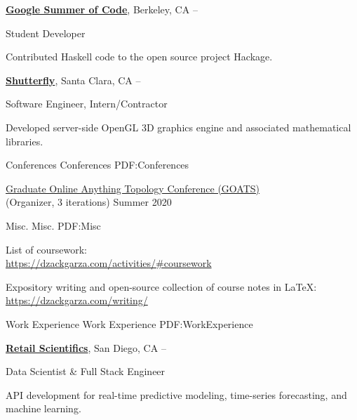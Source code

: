 \documentclass[letterpaper,MMMyyyy,nonstopmode]{simpleresumecv}
\begin{document}
\begin{Body}
\BigGap
\Entry
\href{https://summerofcode.withgoogle.com/archive/}
{\textbf{Google Summer of Code}},
Berkeley, CA
\hfill
{} --

\Gap
\BulletItem
Student Developer

\begin{Detail}
\SubBulletItem
Contributed Haskell code to the open source project Hackage.
\end{Detail}


\BigGap
\Entry
\href{http://www.shutterfly.com/}
{\textbf{Shutterfly}},
Santa Clara, CA
\hfill
{} --

\Gap
\BulletItem
Software Engineer, Intern/Contractor
\begin{Detail}
\SubBulletItem
Developed server-side OpenGL 3D graphics engine and associated mathematical libraries.
\end{Detail}



\Section
{Conferences}
{Conferences}
{PDF:Conferences}

\Gap
\BulletItem \href{https://dzackgarza.com/GOATS_2020/}{Graduate Online Anything Topology Conference (GOATS)} \\
(Organizer, 3 iterations)
\hfill Summer 2020


\Section
{Misc.}
{Misc.}
{PDF:Misc}

\BulletItem 
List of coursework: \\
\href{https://dzackgarza.com/activities/#coursework}{https://dzackgarza.com/activities/#coursework}

\BulletItem 
Expository writing and open-source collection of course notes in \LaTeX: \\
\href{https://dzackgarza.com/writing/}{https://dzackgarza.com/writing/}


\Section
{Work Experience}
{Work Experience}
{PDF:WorkExperience}

\Entry
\href{https://www.retailscientifics.com/}
{\textbf{Retail Scientifics}},
San Diego, CA
\hfill
{} --

\Gap
\BulletItem
Data Scientist \& Full Stack Engineer

\begin{Detail}
\SubBulletItem
API development for real-time predictive modeling, time-series forecasting, and machine learning.
\end{Detail}


\end{Body}
\end{document}

